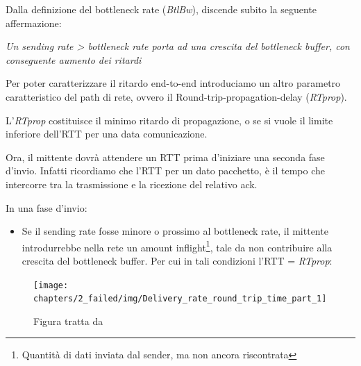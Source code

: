 %
%
%

Dalla definizione del bottleneck rate (\textit{BtlBw}), discende subito la seguente affermazione:

\begin{center}
\label{sending_bottleneck_cons}
\textit{Un sending rate > bottleneck rate porta ad una crescita del bottleneck buffer, con conseguente aumento dei ritardi}
\end{center}

Per poter caratterizzare il ritardo end-to-end introduciamo un altro parametro caratteristico del path di rete, ovvero il Round-trip-propagation-delay (\textit{RTprop}). \bigskip

L'\textit{RTprop} costituisce il minimo ritardo di propagazione, o se si vuole il limite inferiore dell'RTT per una data comunicazione. \bigskip

Ora, il mittente dovrà attendere un RTT prima d'iniziare una seconda fase d'invio. Infatti ricordiamo che l'RTT per un dato pacchetto, è il tempo che intercorre tra la trasmissione e la ricezione del relativo ack. \bigskip

In una fase d'invio:

\begin{itemize}

\item Se il sending rate fosse minore o prossimo al bottleneck rate, il mittente introdurrebbe nella rete un amount inflight\footnote{Quantità di dati inviata dal sender, ma non ancora riscontrata}, tale da non contribuire alla crescita del bottleneck buffer. Per cui in tali condizioni l'RTT = \textit{RTprop}:

\end{itemize}

\begin{figure}[H]

\center
\caption{Delivery rate and round trip time vs inflight part 1}
\label{Delivery_rate_round_trip_time_part_1}
\texttt{[image: chapters/2\_failed/img/Delivery\_rate\_round\_trip\_time\_part\_1]}
\caption*{Figura tratta da \cite[p.~60]{Cardwell:2017:BCC:3042068.3009824}}

\end{figure}

